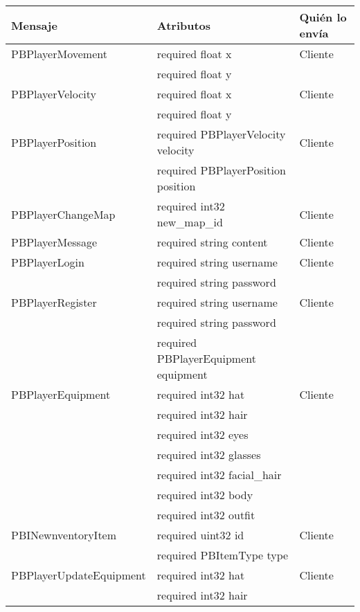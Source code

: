 \label{apendix:protobuf}
\begin{longtable}{|l|l|l|}
    \hline
    \textbf{Mensaje} & \textbf{Atributos} & \textbf{Quién lo envía} \\
    \hline
    PBPlayerMovement & required float x & Cliente \\
                        & required float y & \\
    \hline
    PBPlayerVelocity & required float x & Cliente \\
                        & required float y & \\
    \hline
    PBPlayerPosition & required PBPlayerVelocity velocity & Cliente \\
                        & required PBPlayerPosition position & \\
    \hline
    PBPlayerChangeMap & required int32 new\_map\_id & Cliente \\
    \hline
    PBPlayerMessage & required string content & Cliente \\
    \hline
    PBPlayerLogin & required string username & Cliente \\
                    & required string password & \\
    \hline
    PBPlayerRegister & required string username & Cliente \\
                        & required string password & \\
                        & required PBPlayerEquipment equipment & \\
    \hline
    PBPlayerEquipment & required int32 hat & Cliente \\
                        & required int32 hair & \\
                        & required int32 eyes & \\
                        & required int32 glasses & \\
                        & required int32 facial\_hair & \\
                        & required int32 body & \\
                        & required int32 outfit & \\
    \hline
    PBINewnventoryItem & required uint32 id & Cliente \\
                        & required PBItemType type & \\
    \hline
    PBPlayerUpdateEquipment & required int32 hat & Cliente \\
                            & required int32 hair & \\

\end{longtable}

